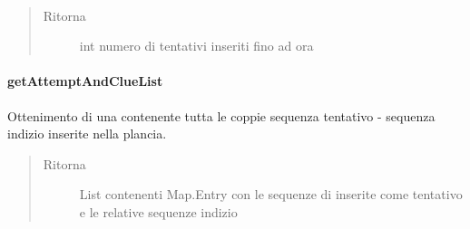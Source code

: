 \documentclass[letterpaper,10pt,italian,openany,oneside]{sphinxmanual}
\begin{document}
\begin{fulllineitems}
\label{\detokenize{source/it/unicam/cs/pa/mastermind/gamecore/BoardModel:it.unicam.cs.pa.mastermind.gamecore.BoardModel.attemptsInserted()}}~\begin{quote}\begin{description}
\item[{Ritorna}] \leavevmode
int numero di tentativi inseriti fino ad ora

\end{description}\end{quote}

\end{fulllineitems}



\paragraph{getAttemptAndClueList}
\label{\detokenize{source/it/unicam/cs/pa/mastermind/gamecore/BoardModel:getattemptandcluelist}}

\begin{fulllineitems}
\label{\detokenize{source/it/unicam/cs/pa/mastermind/gamecore/BoardModel:it.unicam.cs.pa.mastermind.gamecore.BoardModel.getAttemptAndClueList()}}
Ottenimento di una  contenente tutta le coppie sequenza tentativo - sequenza indizio inserite nella plancia.
\begin{quote}\begin{description}
\item[{Ritorna}] \leavevmode
List contenenti Map.Entry con le sequenze di  inserite come tentativo e le relative sequenze indizio

\end{description}\end{quote}

\end{fulllineitems}
\end{document}
